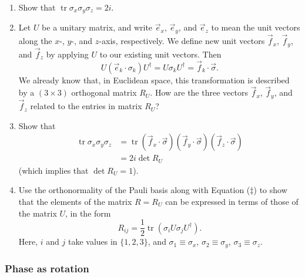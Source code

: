 \documentclass[fleqn,a4paper]{article}
\theoremstyle{definition}
\theoremstyle{definition}
\theoremstyle{definition}
\theoremstyle{definition}
\theoremstyle{remark}
\begin{document}
\begin{enumerate}
\def\labelenumi{\arabic{enumi}.}
\item
  Show that \(\operatorname{tr}\sigma_x\sigma_y\sigma_z = 2i\).
\item
  Let \(U\) be a unitary matrix, and write \(\vec{e}_x\), \(\vec{e}_y\), and \(\vec{e}_z\) to mean the unit vectors along the \(x\)-, \(y\)-, and \(z\)-axis, respectively.
  We define new unit vectors \(\vec{f}_x\), \(\vec{f}_y\), and \(\vec{f}_z\) by applying \(U\) to our existing unit vectors.
  Then
  \[
   U(\vec{e}_k\cdot\sigma_k)U^\dagger=U\sigma_kU^\dagger={\vec{f}_k}\cdot\vec\sigma.
    \]
  We already know that, in Euclidean space, this transformation is described by a \((3\times 3)\) orthogonal matrix \(R_U\).
  How are the three vectors \(\vec{f}_x\), \(\vec{f}_y\), and \(\vec{f}_z\) related to the entries in matrix \(R_U\)?
\item
  Show that
  \[
   \begin{aligned}
     \operatorname{tr}\sigma_x\sigma_y\sigma_z
     &= \operatorname{tr}({\vec f_x}\cdot\vec\sigma)( {\vec f_y}\cdot\vec\sigma)({\vec f_z}\cdot\vec\sigma)
   \\&= 2i\det R_U
   \end{aligned}
    \]
  (which implies that \(\det R_U=1\)).
\item
  Use the orthonormality of the Pauli basis along with Equation (\(\ddagger\)) to show that the elements of the matrix \(R=R_U\) can be expressed in terms of those of the matrix \(U\), in the form
  \[
   R_{ij}=\frac{1}{2}\operatorname{tr}\left(\sigma_i U\sigma_j U^\dagger\right).
    \]
  Here, \(i\) and \(j\) take values in \(\{1,2,3\}\), and \(\sigma_1\equiv\sigma_x\), \(\sigma_2\equiv\sigma_y\), \(\sigma_3\equiv\sigma_z\).
\end{enumerate}

\hypertarget{phase-as-rotation}{%
\subsubsection{Phase as rotation}\label{phase-as-rotation}}
\end{document}
